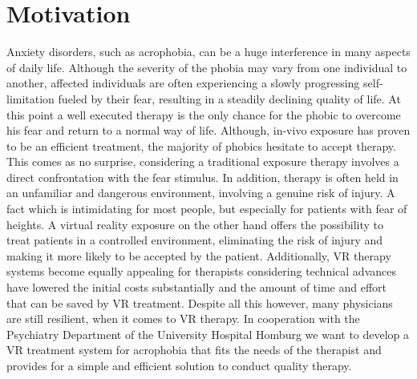 


\section{Motivation}

Anxiety disorders, such as acrophobia, can be a huge interference in many aspects of daily life. Although the severity of the phobia may vary from one individual to another, affected individuals are often experiencing a slowly progressing self-limitation fueled by their fear, resulting in a steadily declining quality of life. At this point a well executed therapy is the only chance for the phobic to overcome his fear and return to a normal way of life. Although, in-vivo exposure has proven to be an efficient treatment, the majority of phobics hesitate to accept therapy. This comes as no surprise, considering a traditional exposure therapy involves a direct confrontation with the fear stimulus. In addition, therapy is often held in an unfamiliar and dangerous environment, involving a genuine risk of injury. A fact which is intimidating for most people, but especially for patients with fear of heights. A virtual reality exposure on the other hand offers the possibility to treat patients in a controlled environment, eliminating the risk of injury and making it more likely to be accepted by the patient. Additionally, VR therapy systems become equally appealing for therapists considering technical advances have lowered the initial costs substantially and the amount of time and effort that can be saved by VR treatment.
Despite all this however, many physicians are still resilient, when it comes to VR therapy.
In cooperation with the Psychiatry Department of the University Hospital Homburg we want to develop a VR treatment system for acrophobia that fits the needs of the therapist and provides for a simple and efficient solution to conduct quality therapy.





